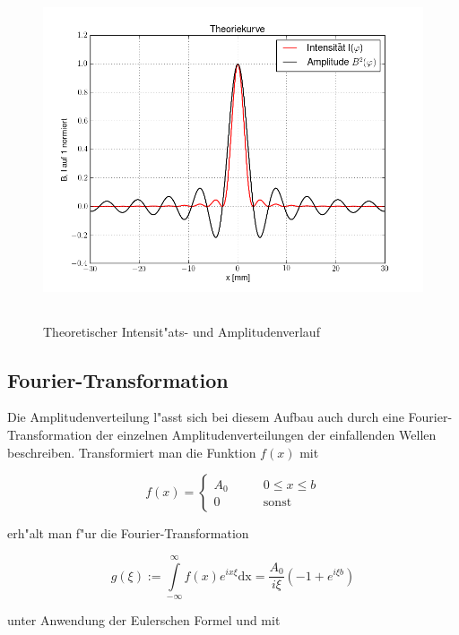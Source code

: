 		\begin{figure}[h]
			\centering
			\includegraphics[height = 10cm]{theorie_1.png}
			\caption{Theoretischer Intensit"ats- und Amplitudenverlauf}
		\end{figure}

	\subsection{Fourier-Transformation}
		\label{subsec:fourier}

		Die Amplitudenverteilung l"asst sich bei diesem Aufbau auch durch eine 
		Four\-ier-Trans\-for\-ma\-tion der einzelnen Amplitudenverteilungen der einfallenden Wellen beschreiben.
		Transformiert man die Funktion $f(x)$ mit

		\begin{equation}
			f(x) = \left\{
			\begin{array}{ll}
			 	 A_0 & \qquad 0 \leq x \leq b \\
			 	 0 & \qquad \mathrm{sonst} 
			 \end{array}
			 \right.
		\end{equation}

		erh"alt man f"ur die Fourier-Transformation

		\begin{equation}
			g(\xi) := \int \limits_{-\infty}^{\infty} f(x) e^{ix \xi} \mathrm{dx} =
			\frac{A_0}{i \xi} \left(-1 + e^{i \xi b}\right)
			\label{amplitude_fourier}
		\end{equation}

		unter Anwendung der Eulerschen Formel und mit

